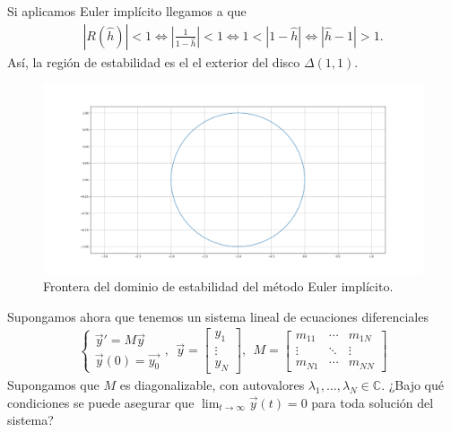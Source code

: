 \begin{ejemplo}
    Si aplicamos Euler implícito llegamos a que
    \begin{align*}
        |R(\hat{h})| < 1 \Longleftrightarrow \left| \frac{1}{1-\hat{h}} \right| < 1 \Longleftrightarrow  1 < |1 -\hat{h}| \Longleftrightarrow |\hat{h} -1| > 1.
    \end{align*}
    Así, la región de estabilidad es el el exterior del disco $\Delta(1,1)$.
    \begin{figure}[H]
        \centering
        \includegraphics[width=1\textwidth]{imagenes/Euler_implicito.png}
        \caption*{Frontera del dominio de estabilidad del método Euler implícito.}
    \end{figure}
\end{ejemplo}

Supongamos ahora que tenemos un sistema lineal de ecuaciones diferenciales
\begin{align*}
    \left\{ \begin{array}{lcc}
                \overrightarrow{y}' = M\overrightarrow{y} \\
                \overrightarrow{y}(0) = \overrightarrow{y_0}
            \end{array}
    \right., \ \ \overrightarrow{y} = \begin{bmatrix}
                                          y_1    \\
                                          \vdots \\
                                          y_N
                                      \end{bmatrix}, \ \ M = \begin{bmatrix}
                                                                 m_{11} & \cdots & m_{1N} \\
                                                                 \vdots & \ddots & \vdots \\
                                                                 m_{N1} & \cdots & m_{NN}
                                                             \end{bmatrix}
\end{align*}
Supongamos que $M$ es diagonalizable, con autovalores $\lambda_1,\ldots,\lambda_N \in \mathbb{C}$. ¿Bajo qué condiciones se puede asegurar que $\lim_{t \to \infty} \overrightarrow{y}(t) = 0$ para toda solución del sistema?


